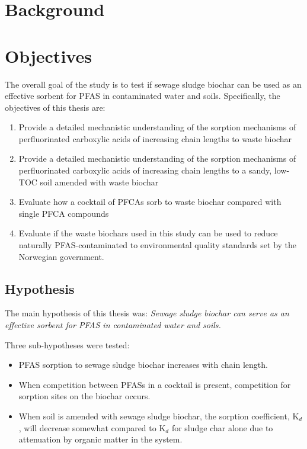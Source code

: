 \section{Background}\label{sec:Background}
 

\section{Objectives}
The overall goal of the study is to test if sewage sludge biochar can be used as an effective sorbent for PFAS in contaminated water and soils. Specifically, the objectives of this thesis are:
\begin{enumerate}
    \item {Provide a detailed mechanistic understanding of the sorption mechanisms of perfluorinated carboxylic acids of increasing chain lengths to waste biochar}
    \item{Provide a detailed mechanistic understanding of the sorption mechanisms of perfluorinated carboxylic acids of increasing chain lengths to a sandy, low-TOC soil amended with waste biochar}
    \item{Evaluate how a cocktail of PFCAs sorb to waste biochar compared with single PFCA compounds}
    \item{Evaluate if the waste biochars used in this study can be used to reduce naturally PFAS-contaminated to environmental quality standards set by the Norwegian government.}
\end{enumerate}

\subsection{Hypothesis}
The main hypothesis of this thesis was:
\textit{Sewage sludge biochar can serve as an effective sorbent for PFAS in contaminated water and soils.}

Three sub-hypotheses were tested:
\begin{itemize}
    \item PFAS sorption to sewage sludge biochar increases with chain length.
    \item When competition between PFASs in a cocktail is present, competition for sorption sites on the biochar occurs.
    \item When soil is amended with sewage sludge biochar, the sorption coefficient, K$_d$, will decrease somewhat compared to K$_d$ for sludge char alone due to attenuation by organic matter in the system. 
\end{itemize}
